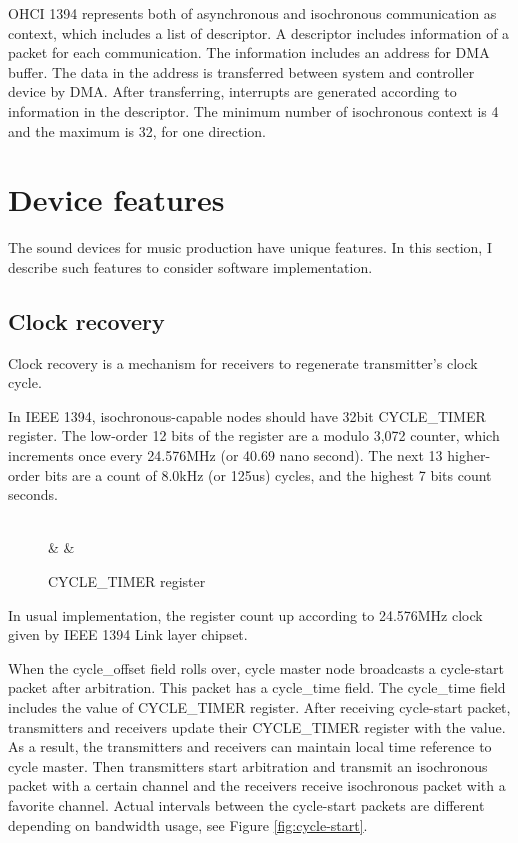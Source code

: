 \documentclass[onecolumn]{article}
\begin{document}
OHCI 1394 represents both of asynchronous and isochronous communication as context, which includes a list of descriptor. A descriptor includes information of a packet for each communication. The information includes an address for DMA buffer. The data in the address is transferred between system and controller device by DMA. After transferring, interrupts are generated according to information in the descriptor. The minimum number of isochronous context is 4 and the maximum is 32, for one direction.

\section{Device features}

The sound devices for music production have unique features. In this section, I describe such features to consider software implementation.

\subsection{Clock recovery}
\label{sec:clock-recovery}

Clock recovery is a mechanism for receivers to regenerate transmitter's clock cycle.

In IEEE 1394\cite{ieee1394-2}, isochronous-capable nodes should have 32bit CYCLE\_TIMER register. The low-order 12 bits of the register are a modulo 3,072 counter, which increments once every 24.576MHz (or 40.69 nano second). The next 13 higher-order bits are a count of 8.0kHz (or 125us) cycles, and the highest 7 bits count seconds.

\begin{figure}[htbp]
\centering
\begin{bytefield}[bitwidth=auto,endianness=big]{32}
	 \\
	 &
	 &
\end{bytefield}
\caption{{CYCLE\_TIMER register}}
\label{cycle_timer}
\end{figure}

In usual implementation, the register count up according to 24.576MHz clock given by IEEE 1394 Link layer chipset.

When the cycle\_offset field rolls over, cycle master node broadcasts a cycle-start packet after arbitration. This packet has a cycle\_time field. The cycle\_time field includes the value of CYCLE\_TIMER register. After receiving cycle-start packet, transmitters and receivers update their CYCLE\_TIMER register with the value. As a result, the transmitters and receivers can maintain local time reference to cycle master. Then transmitters start arbitration and transmit an isochronous packet with a certain channel and the receivers receive isochronous packet with a favorite channel. Actual intervals between the cycle-start packets are different depending on bandwidth usage, see Figure \ref{fig:cycle-start}.
\end{document}
